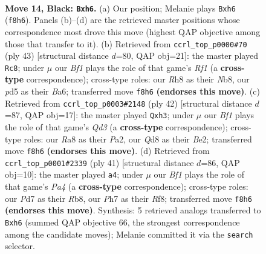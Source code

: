 \documentclass[11pt]{article}
\begin{document}
\clearpage

\begin{figure}[p]\centering
\begin{subfigure}{0.46\textwidth}\centering
\resizebox{\linewidth}{!}{%
\newchessgame
\chessboard[
  setfen={r2q1b1r/3p1k1p/n4ppB/2pP4/P3P1PP/2N5/1P6/R2QK1NR b KQ - 0 14},
  showmover=false,
  pgfstyle=straightmove, color=movearrow, markmove={f8-h6}
]}
\caption{}
\end{subfigure}\hfill
\begin{subfigure}{0.46\textwidth}\centering
\resizebox{\linewidth}{!}{%
\newchessgame
\chessboard[
  setfen={rn3rk1/1q3ppp/b3p3/p1BpP1P1/5P1P/3P4/PP2N3/1KQR3R b - - 0 22},
  showmover=false,
  pgfstyle=straightmove, color=movearrow, markmove={f8-c8}
]}
\caption{}
\end{subfigure}
\\[4pt]
\begin{subfigure}{0.46\textwidth}\centering
\resizebox{\linewidth}{!}{%
\newchessgame
\chessboard[
  setfen={r2q1rk1/1p5p/p3pnp1/8/2PpPP2/2NQ3b/PP2BR1P/R5K1 w - - 0 22},
  showmover=false,
  pgfstyle=straightmove, color=movearrow, markmove={d3-h3}
]}
\caption{}
\end{subfigure}\hfill
\begin{subfigure}{0.46\textwidth}\centering
\resizebox{\linewidth}{!}{%
\newchessgame
\chessboard[
  setfen={1r1q1rk1/4nppp/2bp4/p3p2P/4P3/R1PBN3/1PQ2PP1/4K2R b K - 0 21},
  showmover=false,
  pgfstyle=straightmove, color=movearrow, markmove={a5-a4}
]}
\caption{}
\end{subfigure}
\caption{\textbf{Move 14, Black: \texttt{Bxh6}.} (a) Our position; Melanie plays \texttt{Bxh6} (\texttt{f8h6}). Panels (b)--(d) are the retrieved master positions whose correspondence most drove this move (highest QAP objective among those that transfer to it). (b) Retrieved from \texttt{ccrl\_top\_p0000\#70} (ply 43) [structural distance $d$=80, QAP obj=21]: the master played \texttt{Rc8}; under $\mu$ our \emph{Bf1} plays the role of that game's \emph{Rf1} (a \textbf{cross-type} correspondence); cross-type roles: our \emph{R}h8 as their \emph{N}b8, our \emph{p}d5 as their \emph{B}a6; transferred move \texttt{f8h6} \textbf{(endorses this move)}. (c) Retrieved from \texttt{ccrl\_top\_p0003\#2148} (ply 42) [structural distance $d$=87, QAP obj=17]: the master played \texttt{Qxh3}; under $\mu$ our \emph{Bf1} plays the role of that game's \emph{Qd3} (a \textbf{cross-type} correspondence); cross-type roles: our \emph{R}a8 as their \emph{P}a2, our \emph{Q}d8 as their \emph{B}e2; transferred move \texttt{f8h6} \textbf{(endorses this move)}. (d) Retrieved from \texttt{ccrl\_top\_p0001\#2339} (ply 41) [structural distance $d$=86, QAP obj=10]: the master played \texttt{a4}; under $\mu$ our \emph{Bf1} plays the role of that game's \emph{Pa4} (a \textbf{cross-type} correspondence); cross-type roles: our \emph{P}d7 as their \emph{R}b8, our \emph{P}h7 as their \emph{R}f8; transferred move \texttt{f8h6} \textbf{(endorses this move)}. Synthesis: 5 retrieved analogs transferred to \texttt{Bxh6} (summed QAP objective 66, the strongest correspondence among the candidate moves); Melanie committed it via the \texttt{search} selector.}
\label{fig:thought-m27}
\end{figure}
\end{document}
